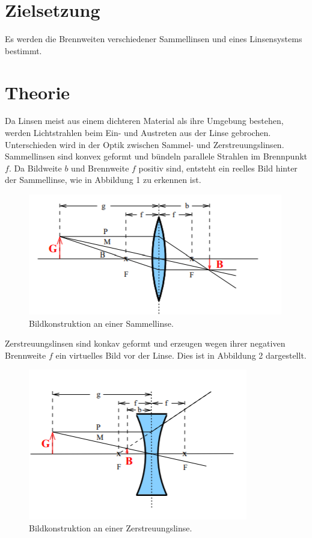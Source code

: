 \section{Zielsetzung}
\label{sec:Zielsetzung}
Es werden die Brennweiten verschiedener Sammellinsen und eines
Linsensystems bestimmt.

\section{Theorie}
\label{sec:Theorie}
Da Linsen meist aus einem dichteren Material als ihre Umgebung bestehen,
werden Lichtstrahlen beim Ein- und Austreten aus der Linse gebrochen.
Unterschieden wird in der Optik zwischen Sammel- und Zerstreuungslinsen.
Sammellinsen sind konvex geformt und bündeln parallele Strahlen im
Brennpunkt $f$. Da Bildweite $b$ und Brennweite $f$ positiv sind,
entsteht ein reelles Bild hinter der Sammellinse, wie in Abbildung 1
zu erkennen ist.
\begin{figure}[H]
\label{eq:sammellinse}
\center
\includegraphics[scale=0.75]{sammellinse.png}
\caption{Bildkonstruktion an einer Sammellinse. \cite[S.1]{kent}}
\end{figure}

\noindent Zerstreuungslinsen sind konkav geformt und erzeugen wegen ihrer negativen
Brennweite $f$ ein virtuelles Bild vor der Linse.  Dies ist in Abbildung 2
dargestellt.

\begin{figure}[H]
\label{fig:zerstreuung}
\center
\includegraphics[scale=0.75]{zerstreuung.png}
\caption{Bildkonstruktion an einer Zerstreuungslinse.\cite[S.1]{kent}}
\end{figure}

